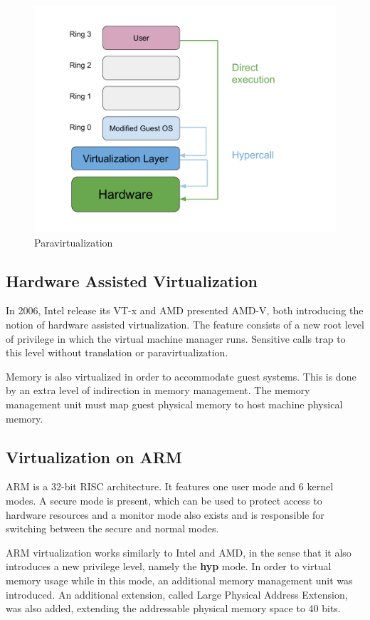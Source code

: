\begin{figure}[h]
\centering
  \includegraphics[width=.65\linewidth]{img/paravirt.pdf}
  \caption{Paravirtualization}
\end{figure}

\subsection{Hardware Assisted Virtualization}
\label{subsec:havirt}

In 2006, Intel release its VT-x and AMD presented AMD-V, both introducing the notion of hardware assisted virtualization. The feature consists of a new root level of privilege in which the virtual machine manager runs. Sensitive calls trap to this level without  translation or paravirtualization\cite{vmware}.

Memory is also virtualized in order to accommodate guest systems. This is done by an extra level of indirection in memory management. The memory management unit must map guest physical memory to host machine physical memory\cite{genode-arm}.

\subsection{Virtualization on ARM}
\label{subsec:armvirt}

ARM is a 32-bit RISC architecture. It features one user mode and 6 kernel modes. A secure mode is present, which can be used to protect access to hardware resources and a monitor mode also exists and is responsible for switching between the secure and normal modes\cite{hw-support-arm}.

ARM virtualization works similarly to Intel and AMD, in the sense that it also introduces a new privilege level, namely the \textbf{hyp} mode. In order to virtual memory usage while in this mode, an additional memory management unit was introduced. An additional extension, called Large Physical Address Extension, was also added, extending the addressable physical memory space to 40 bits\cite{genode-arm}.

